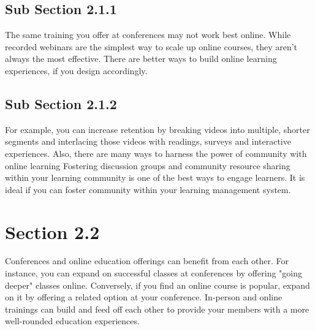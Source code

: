 \subsection{Sub Section 2.1.1}
\label{subsection:2-2-1}

The same training you offer at conferences may not work best online. While recorded webinars are the simplest way to scale up online courses, they aren't always the most effective. There are better ways to build online learning experiences, if you design accordingly. 

\subsection{Sub Section 2.1.2}
\label{subsection:2-2-2}

For example, you can increase retention by breaking videos into multiple, shorter segments and interlacing those videos with readings, surveys and interactive experiences. Also, there are many ways to harness the power of community with online learning Fostering discussion groups and community resource sharing within your learning community is one of the best ways to engage learners. It is ideal if you can foster community within your learning management system.

\section{Section 2.2}
\label{section:2-2}
Conferences and online education offerings can benefit from each other. For instance, you can expand on successful classes at conferences by offering "going deeper" classes online. Conversely, if you find an online course is popular, expand on it by offering a related option at your conference. In-person and online trainings can build and feed off each other to provide your members with a more well-rounded education experiences. 



